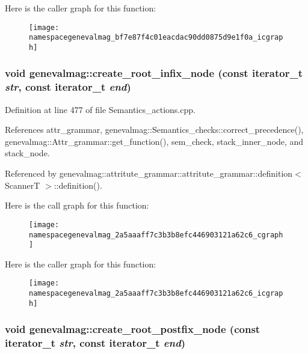 Here is the caller graph for this function:\nopagebreak
\begin{figure}[H]
\begin{center}
\leavevmode
\texttt{[image: namespacegenevalmag\_bf7e87f4c01eacdac90dd0875d9e1f0a\_icgraph]}
\end{center}
\end{figure}
\hypertarget{namespacegenevalmag_2a5aaaff7c3b3b8efc446903121a62c6}{
\subsubsection[{create\_\-root\_\-infix\_\-node}]{\setlength{\rightskip}{0pt plus 5cm}void genevalmag::create\_\-root\_\-infix\_\-node (const iterator\_\-t {\em str}, \/  const iterator\_\-t {\em end})}}
\label{namespacegenevalmag_2a5aaaff7c3b3b8efc446903121a62c6}




Definition at line 477 of file Semantics\_\-actions.cpp.

References attr\_\-grammar, genevalmag::Semantics\_\-checks::correct\_\-precedence(), genevalmag::Attr\_\-grammar::get\_\-function(), sem\_\-check, stack\_\-inner\_\-node, and stack\_\-node.

Referenced by genevalmag::attritute\_\-grammar::attritute\_\-grammar::definition$<$ ScannerT $>$::definition().

Here is the call graph for this function:\nopagebreak
\begin{figure}[H]
\begin{center}
\leavevmode
\texttt{[image: namespacegenevalmag\_2a5aaaff7c3b3b8efc446903121a62c6\_cgraph]}
\end{center}
\end{figure}


Here is the caller graph for this function:\nopagebreak
\begin{figure}[H]
\begin{center}
\leavevmode
\texttt{[image: namespacegenevalmag\_2a5aaaff7c3b3b8efc446903121a62c6\_icgraph]}
\end{center}
\end{figure}
\hypertarget{namespacegenevalmag_d2e6e0ea9f03843a2adb23ea4c43453f}{
\subsubsection[{create\_\-root\_\-postfix\_\-node}]{\setlength{\rightskip}{0pt plus 5cm}void genevalmag::create\_\-root\_\-postfix\_\-node (const iterator\_\-t {\em str}, \/  const iterator\_\-t {\em end})}}
\label{namespacegenevalmag_d2e6e0ea9f03843a2adb23ea4c43453f}




